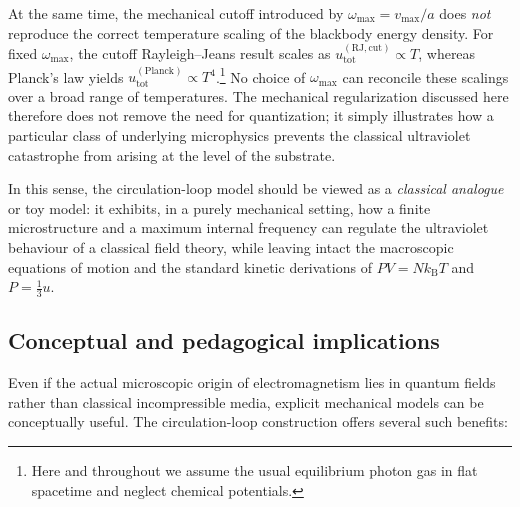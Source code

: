 \documentclass[11pt]{article}
\begin{document}
            At the same time, the mechanical cutoff introduced by $\omega_{\max} = v_{\max}/a$ does
            \emph{not} reproduce the correct temperature scaling of the blackbody energy density.
            For fixed $\omega_{\max}$, the cutoff Rayleigh--Jeans result scales as
            $u_{\mathrm{tot}}^{(\mathrm{RJ,cut})} \propto T$, whereas Planck's law yields
            $u_{\mathrm{tot}}^{(\mathrm{Planck})} \propto T^4$.\footnote{Here and throughout we
    assume the usual equilibrium photon gas in flat spacetime and neglect chemical
    potentials.} No choice of $\omega_{\max}$ can reconcile these scalings over a broad
            range of temperatures. The mechanical regularization discussed here therefore does not
            remove the need for quantization; it simply illustrates how a particular class of
            underlying microphysics prevents the classical ultraviolet catastrophe from arising at
            the level of the substrate.

            In this sense, the circulation-loop model should be viewed as a \emph{classical analogue}
            or toy model: it exhibits, in a purely mechanical setting, how a finite microstructure
            and a maximum internal frequency can regulate the ultraviolet behaviour of a classical
            field theory, while leaving intact the macroscopic equations of motion and the standard
            kinetic derivations of $PV = N k_{\mathrm B}T$ and $P = \tfrac{1}{3}u$.

        \subsection{Conceptual and pedagogical implications}

            Even if the actual microscopic origin of electromagnetism lies in quantum fields rather
            than classical incompressible media, explicit mechanical models can be conceptually
            useful. The circulation-loop construction offers several such benefits:
\end{document}
